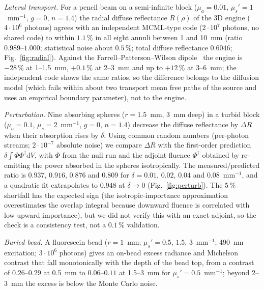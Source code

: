 \documentclass[journal]{IEEEtran}
\newcommand{\mua}{\mu_a}
\newcommand{\mus}{\mu_s}
\newcommand{\musp}{\mu_s'}
\begin{document}
\emph{Lateral transport.} For a pencil beam on a semi-infinite block ($\mua=0.01$, $\musp=1$~mm$^{-1}$, $g=0$, $n=1.4$) the radial diffuse reflectance $R(\rho)$ of the 3D engine ($4\cdot10^6$ photons) agrees with an independent MCML-type code ($2\cdot10^7$ photons, no shared code) to within $1.1\,\%$ in all eight annuli between 1 and 10~mm (ratio $0.989$--$1.000$; statistical noise about $0.5\,\%$; total diffuse reflectance $0.6046$; Fig.~\ref{fig:radial}). Against the Farrell--Patterson--Wilson dipole~\cite{farrell1992} the engine is $-28\,\%$ at 1--1.5~mm, $+0.1\,\%$ at 2--3~mm and up to $+12\,\%$ at 3--6~mm; the independent code shows the same ratios, so the difference belongs to the diffusion model (which fails within about two transport mean free paths of the source and uses an empirical boundary parameter), not to the engine.

\emph{Perturbation.} Nine absorbing spheres ($r=1.5$~mm, 3~mm deep) in a turbid block ($\mua=0.1$, $\mus=2$~mm$^{-1}$, $g=0$, $n=1.4$) decrease the diffuse reflectance by $\Delta R$ when their absorption rises by $\delta$. Using common random numbers (per-photon streams; $2\cdot10^{-7}$ absolute noise) we compare $\Delta R$ with the first-order prediction $\delta\!\int\!\Phi\Phi^\dagger\mathrm dV$, with $\Phi$ from the null run and the adjoint fluence $\Phi^\dagger$ obtained by re-emitting the power absorbed in the spheres isotropically. The measured$/$predicted ratio is $0.937$, $0.916$, $0.876$ and $0.809$ for $\delta=0.01$, $0.02$, $0.04$ and $0.08$~mm$^{-1}$, and a quadratic fit extrapolates to $0.948$ at $\delta\to0$ (Fig.~\ref{fig:perturb}). The $5\,\%$ shortfall has the expected sign (the isotropic-importance approximation overestimates the overlap integral because downward fluence is correlated with low upward importance), but we did not verify this with an exact adjoint, so the check is a consistency test, not a $0.1\,\%$ validation.

\emph{Buried bead.} A fluorescein bead ($r=1$~mm; $\musp=0.5$, $1.5$, $3$~mm$^{-1}$; 490~nm excitation; $3\cdot10^6$ photons) gives an on-bead excess radiance and Michelson contrast that fall monotonically with the depth of the bead top, from a contrast of $0.26$--$0.29$ at 0.5~mm to $0.06$--$0.11$ at 1.5--3~mm for $\musp=0.5$~mm$^{-1}$; beyond 2--3~mm the excess is below the Monte Carlo noise.
\end{document}
